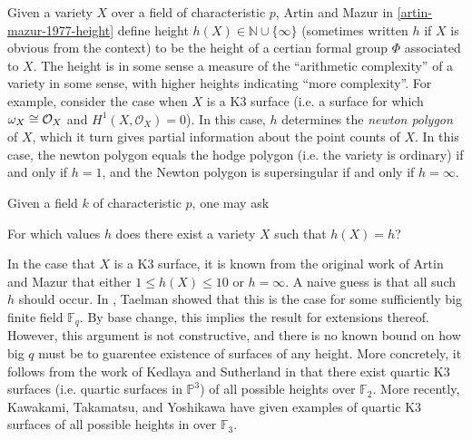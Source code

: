 
Given a variety \(X\) over a field of characteristic \(p\),
Artin and Mazur in \ref{artin-mazur-1977-height}
define height \(h(X) \in \mathbb{N} \cup \{\infty\}\) 
(sometimes written \(h\) if \(X\) is obvious from the context)
to be the height 
of a certian formal group \(\Phi\) associated to \(X\).
The height is in some sense a measure of the
``arithmetic complexity'' of a variety in some sense,
with higher heights indicating ``more complexity''.
For example, consider the case when \(X\) is a 
K3 surface (i.e. a surface for which \(\omega_{X} \cong \mathcal{O}_{X} \) 
and \(H^{1}(X,\mathcal{O}_{X} ) = 0\)).
In this case, \(h\) determines the \textit{newton polygon}
of \(X\), which it turn gives partial information about the 
point counts of \(X\).
In this case, the newton polygon equals the hodge polygon
(i.e. the variety is ordinary) if and only if \(h=1\),
and the Newton polygon is supersingular if and only if 
\(h = \infty\).

Given a field \(k\) of characteristic \(p\), one may ask

\begin{quest}
    For which values \(h\) does there exist a variety
    \(X\) such that \(h(X) = h\)?
\end{quest}

In the case that \(X\) is a K3 surface, it is known from the 
original work of Artin and Mazur
that either \(1 \leq h(X) \leq 10\) or \(h = \infty\).
A naive guess is that all such \(h\) should occur.
In \cite{taelman-2016-k3-given-l-function}, 
Taelman showed that
this is the case
for some sufficiently big finite field \(\mathbb{F}_{q}\).
By base change, this implies the result for extensions
thereof.
However, this argument is not constructive,
and there is no known bound on how big \(q\) must be to guarentee
existence of surfaces of any height.
More concretely, it follows from the work of
Kedlaya and Sutherland in 
\cite{kedlaya-sutherland-2016-census-k3-f2}
that there exist quartic K3 surfaces
(i.e. quartic surfaces in \(\mathbb{P}^{3}\))
of all possible heights over \(\mathbb{F}_{2}\).
More recently,
Kawakami, Takamatsu, and Yoshikawa 
have given examples of quartic K3 surfaces
of all possible heights in 
\cite{kty-2022-fedder} over \(\mathbb{F}_{3}\).

